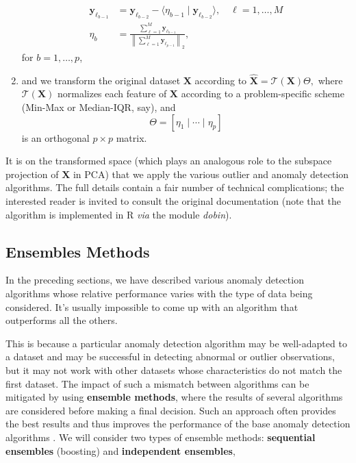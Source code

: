 \begin{enumerate}[noitemsep]
\begin{align*}
\mathbf{y}_{\ell_{b-1}}&=\mathbf{y}_{\ell_{b-2}}-\langle\eta_{b-1} \mid \mathbf{y}_{\ell_{b-2}}\rangle,\quad \ell=1,\ldots, M \\ 
\eta_b&=\frac{\sum_{\ell=1}^M\mathbf{y}_{\ell_{b-1}}}{\left\|\sum_{\ell=1}^M\mathbf{y}_{\ell_{p-1}}\right\|_2},
\end{align*} for $b=1,\ldots,p$,
\item and we transform the original dataset   $\mathbf{X}$ according to  $\hat{\mathbf{X}}=\mathcal{T}(\mathbf{X})\Theta,$ where $\mathcal{T}(\mathbf{X})$ normalizes each feature of  $\mathbf{X}$ according to a problem-specific scheme  (Min-Max or Median-IQR, say), and $$\Theta=[\eta_1\mid\cdots\mid \eta_p]$$ is an orthogonal $p\times p$ matrix.  
\end{enumerate}
It is on the transformed space (which plays an analogous role to the subspace projection of  $\mathbf{X}$ in PCA) that we apply the various outlier and anomaly detection algorithms.\newl 
The full details contain a fair number of technical complications; the interested reader is invited to consult the original documentation \cite{A6} (note that the algorithm is implemented in R \textit{via} the module \textit{dobin}). 
%
\subsection{Ensembles Methods}
%
%
In the preceding sections, we have described various anomaly detection algorithms whose relative performance varies with the type of data being considered. It's usually impossible to come up with an algorithm that outperforms all the others. \par This is because a particular anomaly detection algorithm may be well-adapted to a dataset and may be successful in detecting abnormal or outlier observations, but it may not work with other datasets whose characteristics do not match the first dataset. \newl The impact of such a mismatch between algorithms can be mitigated by using  \textbf{ensemble methods}, where the results of several algorithms are considered before making a final decision. Such an approach often provides the best results and thus improves the performance of the base anomaly detection algorithms \cite{A10}. 
\newl We will consider two types of ensemble methods:  \textbf{sequential ensembles} (boosting) and \textbf{independent ensembles}, 
